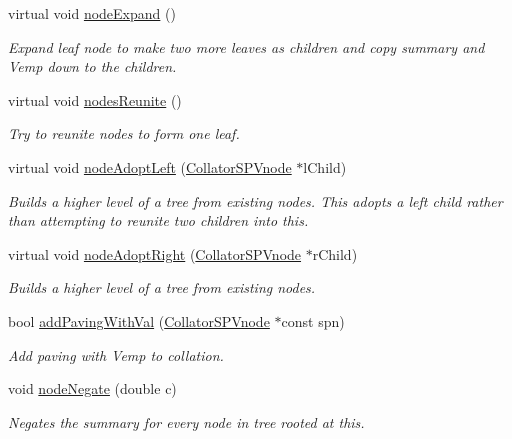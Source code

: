 \begin{DoxyCompactItemize}
virtual void \hyperlink{classsubpavings_1_1CollatorSPVnode_a43e370d7120f8cc8c1cde489f61e7fc5}{node\-Expand} ()
\begin{DoxyCompactList}\small\item\em \-Expand leaf node to make two more leaves as children and copy summary and \-Vemp down to the children. \end{DoxyCompactList}\item 
virtual void \hyperlink{classsubpavings_1_1CollatorSPVnode_abef4fa1adf9483d78e21350712864fd2}{nodes\-Reunite} ()
\begin{DoxyCompactList}\small\item\em \-Try to reunite nodes to form one leaf. \end{DoxyCompactList}\item 
virtual void \hyperlink{classsubpavings_1_1CollatorSPVnode_a7a6318a53eb8efeecc8ea81244c98859}{node\-Adopt\-Left} (\hyperlink{classsubpavings_1_1CollatorSPVnode}{\-Collator\-S\-P\-Vnode} $\ast$l\-Child)
\begin{DoxyCompactList}\small\item\em \-Builds a higher level of a tree from existing nodes. \-This adopts a left child rather than attempting to reunite two children into this. \end{DoxyCompactList}\item 
virtual void \hyperlink{classsubpavings_1_1CollatorSPVnode_a47cfd580379397fa0f713de7306a65c3}{node\-Adopt\-Right} (\hyperlink{classsubpavings_1_1CollatorSPVnode}{\-Collator\-S\-P\-Vnode} $\ast$r\-Child)
\begin{DoxyCompactList}\small\item\em \-Builds a higher level of a tree from existing nodes. \end{DoxyCompactList}\item 
bool \hyperlink{classsubpavings_1_1CollatorSPVnode_af01fff5efb1889862b36606bed10746a}{add\-Paving\-With\-Val} (\hyperlink{classsubpavings_1_1CollatorSPVnode}{\-Collator\-S\-P\-Vnode} $\ast$const spn)
\begin{DoxyCompactList}\small\item\em \-Add paving with \-Vemp to collation. \end{DoxyCompactList}\item 
void \hyperlink{classsubpavings_1_1CollatorSPVnode_a0c7ea11fa66829ec974813779c052c61}{node\-Negate} (double c)
\begin{DoxyCompactList}\small\item\em \-Negates the summary for every node in tree rooted at this. \end{DoxyCompactList}\item 

\end{DoxyCompactItemize}
